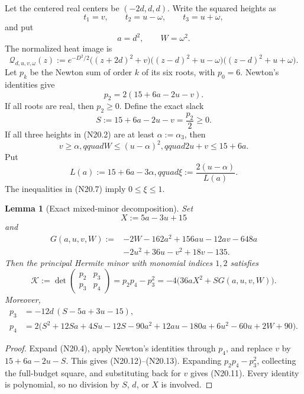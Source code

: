 \documentclass[11pt]{article}
\newtheorem{lemma}[theorem]{Lemma}
\theoremstyle{definition}
\theoremstyle{remark}
\begin{document}
Let the centered real centers be \((-2d,d,d)\).  Write the squared heights as
\[
 t_1=v,\qquad t_2=u-\omega,\qquad t_3=u+\omega,
 \tag{N20.2}
\]
and put
\[
 a=d^2,\qquad W=\omega^2.
 \tag{N20.3}
\]
The normalized heat image is
\[
 \mathcal Q_{d,u,v,\omega}(z)
 :=e^{-D^2/2}
 \bigl((z+2d)^2+v\bigr)
 \bigl((z-d)^2+u-\omega\bigr)
 \bigl((z-d)^2+u+\omega\bigr).
 \tag{N20.4}
\]
Let \(p_k\) be the Newton sum of order \(k\) of its six roots, with
\(p_0=6\).  Newton's identities give
\[
 p_2=2(15+6a-2u-v).
 \tag{N20.5}
\]
If all roots are real, then \(p_2\geq0\).  Define the exact slack
\[
 S:=15+6a-2u-v=\frac{p_2}{2}\geq0.
 \tag{N20.6}
\]
If all three heights in \textup{(N20.2)} are at least
\(\alpha:=\alpha_3\), then
\[
 v\geq\alpha,qquad W\leq(u-\alpha)^2,qquad
 2u+v\leq15+6a.
 \tag{N20.7}
\]
Put
\[
 L(a):=15+6a-3\alpha,qquad
 \xi:=\frac{2(u-\alpha)}{L(a)}.
 \tag{N20.8}
\]
The inequalities in \textup{(N20.7)} imply \(0\leq\xi\leq1\).

\begin{lemma}[Exact mixed-minor decomposition]
\label{lem:f2v20-decomposition}
Set
\[
 X:=5a-3u+15
 \tag{N20.9}
\]
and
\[
\begin{aligned}
 G(a,u,v,W):={}&-2W-162a^2+156au-12av-648a\\
 &-2u^2+36u-v^2+18v-135.
\end{aligned}
\tag{N20.10}
\]
Then the principal Hermite minor with monomial indices \(1,2\) satisfies
\[
 \mathcal K
 :=\det\!\begin{pmatrix}p_2&p_3\\p_3&p_4\end{pmatrix}
 =p_2p_4-p_3^2
 =-4\bigl(36aX^2+S G(a,u,v,W)\bigr).
 \tag{N20.11}
\]
Moreover,
\begin{align}
 p_3&=-12d\,(S-5a+3u-15), \tag{N20.12}\\
 p_4&=2\bigl(S^2+12Sa+4Su-12S-90a^2+12au-180a
             +6u^2-60u+2W+90\bigr). \tag{N20.13}
\end{align}
\end{lemma}

\begin{proof}
Expand \textup{(N20.4)}, apply Newton's identities through \(p_4\), and
replace \(v\) by \(15+6a-2u-S\).  This gives
\textup{(N20.12)}--\textup{(N20.13)}.  Expanding
\(p_2p_4-p_3^2\), collecting the full-budget square, and substituting back
for \(v\) gives \textup{(N20.11)}.  Every identity is polynomial, so no
division by \(S\), \(d\), or \(X\) is involved.
\end{proof}
\end{document}
